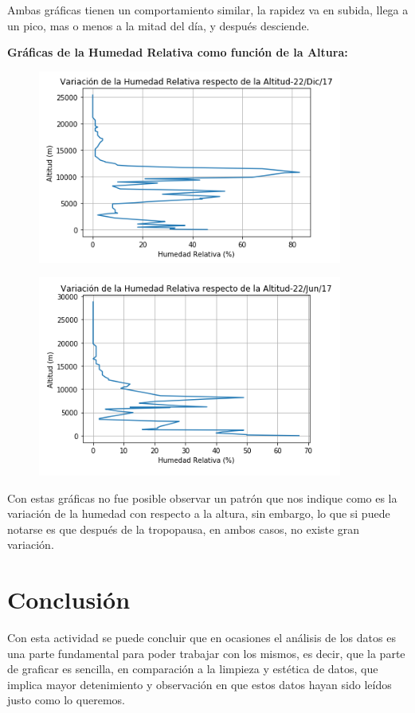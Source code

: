 \documentclass[a4paper]{article}
\begin{document}
Ambas gráficas tienen un comportamiento similar, la rapidez va en subida, llega a un pico, mas o menos a la mitad del día, y después desciende.

\newpage
\textbf{Gráficas de la Humedad Relativa como función de la Altura:}

\begin{figure}[h!]
  \includegraphics[width=10cm]{graf9.png}
  \centering
  \label{fig:13}
\end{figure}

\begin{figure}[h!]
  \includegraphics[width=10cm]{graf10.png}
  \centering
  \label{fig:14}
\end{figure}

Con estas gráficas no fue posible observar un patrón que nos indique como es la variación de la humedad con respecto a la altura, sin embargo, lo que si puede notarse es que después de la tropopausa, en ambos casos, no existe gran variación. 

\section {Conclusión}

Con esta actividad se puede concluir que en ocasiones el análisis de los datos es una parte fundamental para poder trabajar con los mismos, es decir, que la parte de graficar es sencilla, en comparación a la limpieza y estética de datos, que implica mayor detenimiento y observación en que estos datos hayan sido leídos justo como lo queremos. \\
\end{document}
